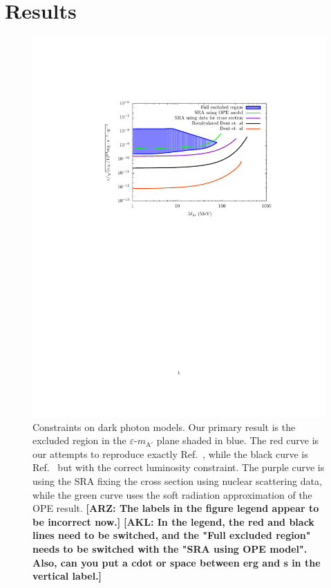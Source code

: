 \documentclass[nofootinbib,prd,superscriptaddress,twocolumn]{revtex4}
\newcommand{\arz}[1]{{{\bf{\color{BrickRed}[ARZ: #1]}}}}
\newcommand{\akl}[1]{{{\bf{\color{Blue}[AKL: #1]}}}}
\begin{document}
\section{Results}
\label{section:results}



\begin{figure}[th]
\includegraphics[width=14cm]{compiledbounds_edited.pdf}
\caption{
Constraints on dark photon models. Our primary result is the excluded region 
in the $\varepsilon$-$m_{\mathrm{A'}}$ plane shaded in blue. The red curve is our attempts to reproduce exactly Ref.~\cite{dent_etal12}, while the black curve is Ref.~\cite{dent_etal12} but with the correct luminosity constraint.  The purple curve is using the SRA fixing the cross section using nuclear scattering data, while the green curve uses the soft radiation approximation of the OPE result.  \arz{The labels in the figure legend appear to be incorrect now.} \akl{In the legend, the red and black lines need to be switched, and the "Full excluded region" needs to be switched with the "SRA using OPE model". Also, can you put a cdot or space between erg and s in the vertical label.}
}
\label{fig:constraint}
\end{figure}
\end{document}
